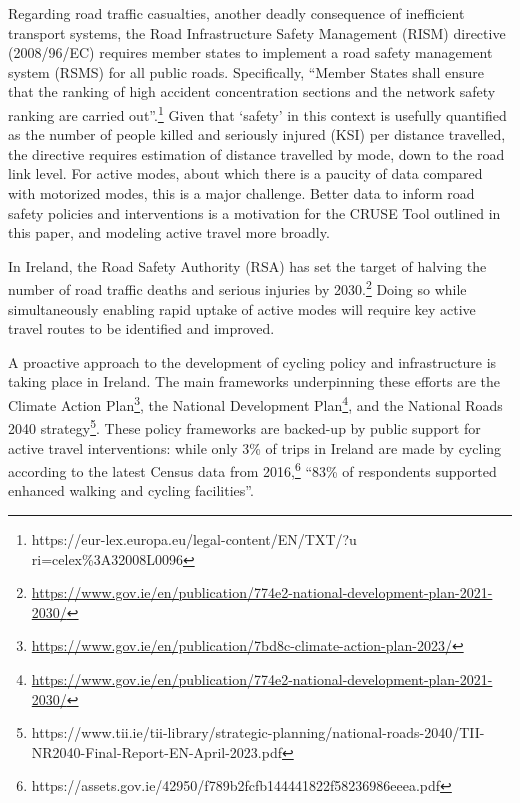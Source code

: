 \documentclass[
  super,
  preprint,
  3p]{elsarticle}
\begin{document}
Regarding road traffic casualties, another deadly consequence of
inefficient transport systems, the Road Infrastructure Safety Management
(RISM) directive (2008/96/EC) requires member states to implement a road
safety management system (RSMS) for all public roads. Specifically,
``Member States shall ensure that the ranking of high accident
concentration sections and the network safety ranking are carried
out''.\footnote{https://eur-lex.europa.eu/legal-content/EN/TXT/?u
  ri=celex\%3A32008L0096} Given that `safety' in this context is
usefully quantified as the number of people killed and seriously injured
(KSI) per distance travelled, the directive requires estimation of
distance travelled by mode, down to the road link level. For active
modes, about which there is a paucity of data compared with motorized
modes, this is a major challenge. Better data to inform road safety
policies and interventions is a motivation for the CRUSE Tool outlined
in this paper, and modeling active travel more broadly.

In Ireland, the Road Safety Authority (RSA) has set the target of
halving the number of road traffic deaths and serious injuries by
2030.\footnote{\url{https://www.gov.ie/en/publication/774e2-national-development-plan-2021-2030/}}
Doing so while simultaneously enabling rapid uptake of active modes will
require key active travel routes to be identified and improved.

A proactive approach to the development of cycling policy and
infrastructure is taking place in Ireland. The main frameworks
underpinning these efforts are the Climate Action Plan\footnote{\url{https://www.gov.ie/en/publication/7bd8c-climate-action-plan-2023/}},
the National Development Plan\footnote{\url{https://www.gov.ie/en/publication/774e2-national-development-plan-2021-2030/}},
and the National Roads 2040 strategy\footnote{
  https://www.tii.ie/tii-library/strategic-planning/national-roads-2040/TII-NR2040-Final-Report-EN-April-2023.pdf}.
These policy frameworks are backed-up by public support for active
travel interventions: while only 3\% of trips in Ireland are made by
cycling according to the latest Census data from 2016,\footnote{
  https://assets.gov.ie/42950/f789b2fcfb144441822f58236986eeea.pdf}
``83\% of respondents supported enhanced walking and cycling
facilities''.
\end{document}
